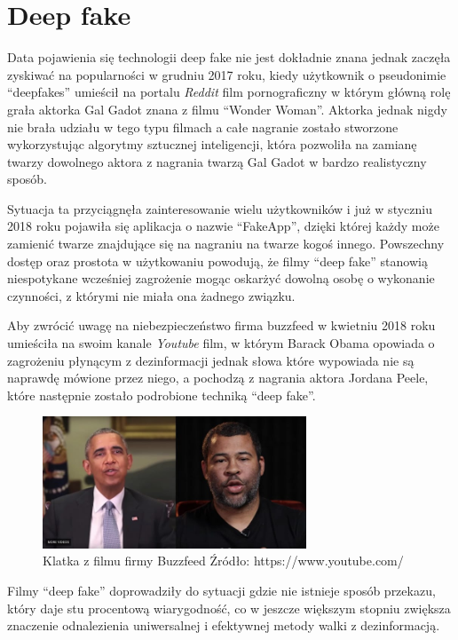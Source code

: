 \section{Deep fake}

Data pojawienia się technologii deep fake nie jest dokładnie znana jednak zaczęła zyskiwać na popularności 
w grudniu 2017 roku, kiedy użytkownik o pseudonimie ``deepfakes'' umieścił na portalu \emph{Reddit} film
pornograficzny w którym główną rolę grała aktorka Gal Gadot znana z filmu ``Wonder Woman''. Aktorka jednak 
nigdy nie brała udziału w tego typu filmach a całe nagranie zostało stworzone wykorzystując algorytmy sztucznej
inteligencji, która pozwoliła na zamianę twarzy dowolnego aktora z nagrania twarzą Gal Gadot w bardzo realistyczny sposób.

Sytuacja ta przyciągnęła zainteresowanie wielu użytkowników i już w styczniu 2018 roku pojawiła się aplikacja o nazwie
``FakeApp'', dzięki której każdy może zamienić twarze znajdujące się na nagraniu na twarze kogoś innego.
Powszechny dostęp oraz prostota w użytkowaniu powodują, że filmy ``deep fake'' stanowią niespotykane wcześniej zagrożenie
mogąc oskarżyć dowolną osobę o wykonanie czynności, z którymi nie miała ona żadnego związku. 

Aby zwrócić uwagę na niebezpieczeństwo firma buzzfeed w kwietniu 2018 roku umieściła na swoim kanale \emph{Youtube} film, w którym Barack Obama opowiada 
o zagrożeniu płynącym z dezinformacji jednak słowa które wypowiada nie są naprawdę mówione przez niego, a pochodzą
z nagrania aktora Jordana Peele, które następnie zostało podrobione techniką ``deep fake''.

\begin{figure}[h!]
    \centering
    \includegraphics[width=0.7\textwidth]{./Img/peele.jpg}
    \caption{Klatka z filmu firmy Buzzfeed Źródło: https://www.youtube.com/}
\end{figure}

Filmy ``deep fake'' doprowadziły do sytuacji gdzie nie istnieje sposób przekazu, który daje stu procentową wiarygodność,
co w jeszcze większym stopniu zwiększa znaczenie odnalezienia uniwersalnej i efektywnej metody walki z dezinformacją. 